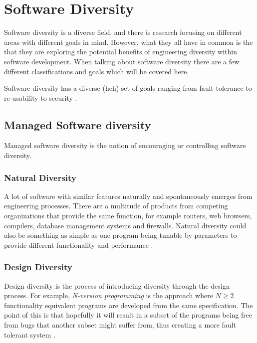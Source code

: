 \section{Software Diversity}

Software diversity is a diverse field, and there is research focusing on different areas
with different goals in mind. However, what they all have in common is the that they are
exploring the potential benefits of engineering diversity within software development.
When talking about software diversity there are a few different classifications and goals
\cite[Section~1]{survey} which will be covered here.

Software diversity has a diverse (heh) set of goals ranging from fault-tolerance to re-usability
to security \cite{survey}.

\subsection{Managed Software diversity}

Managed software diversity is the notion of encouraging or controlling software diversity.

\subsubsection{Natural Diversity}

A lot of software with similar features naturally and spontaneously emerges from engineering
processes. There are a multitude of products from competing organizations that provide
the same function, for example routers, web browsers, compilers, database management systems
and firewalls. Natural diversity could also be something as simple as one program being
tunable by parameters to provide different functionality and performance \cite{survey}.

\subsubsection{Design Diversity}

Design diversity is the process of introducing diversity through the design process. For
example, \textit{N-version programming} is the approach where $N \geq 2$ functionality equivalent
programs are developed from the same specification. The point of this is that hopefully
it will result in a subset of the programs being free from bugs that another subset
might suffer from, thus creating a more fault tolerant system \cite{n-version}.

